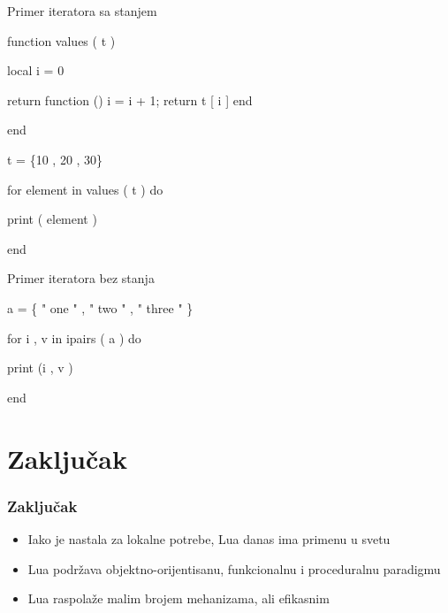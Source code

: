 \documentclass{beamer}
\begin{document}
\begin{frame}

\begin{block}{Primer iteratora sa stanjem}
\begin{semiverbatim}
function values ( t )

	\quad local i = 0
	
	\quad return function () i = i + 1; return t [ i ] end
	
end

t = \{10 , 20 , 30\}

for element in values ( t ) do

	\quad print ( element )
	
end
\end{semiverbatim}
\end{block}

\begin{block}{Primer iteratora bez stanja}
\begin{semiverbatim}
a = \{ " one " , " two " , " three " \}

for i , v in ipairs ( a ) do

	\quad print (i , v )

end

\end{semiverbatim}
\end{block}


\end{frame}


\section{Zaključak}

\begin{frame}
\frametitle{Zaključak}

\begin{itemize}
\item Iako je nastala za lokalne potrebe, Lua danas ima primenu u svetu
\item Lua podržava objektno-orijentisanu, funkcionalnu i proceduralnu paradigmu
\item Lua raspolaže malim brojem mehanizama, ali efikasnim
\end{itemize}

\end{frame}

\end{document}
